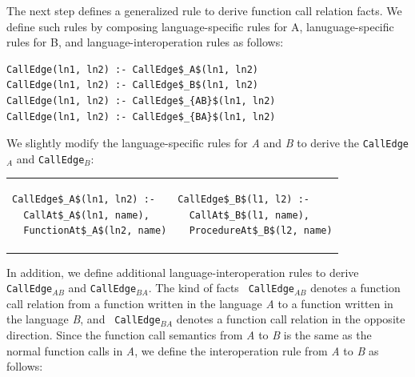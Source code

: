 The next step defines a generalized rule to derive function call relation
facts. We define such rules by composing language-specific rules for A,
lanuguage-specific rules for B, and language-interoperation rules as follows:

\begin{lstlisting}
CallEdge(ln1, ln2) :- CallEdge$_A$(ln1, ln2)
CallEdge(ln1, ln2) :- CallEdge$_B$(ln1, ln2)
CallEdge(ln1, ln2) :- CallEdge$_{AB}$(ln1, ln2)
CallEdge(ln1, ln2) :- CallEdge$_{BA}$(ln1, ln2)
\end{lstlisting}


\noindent 
We slightly modify the language-specific rules for {\it A} and {\it B} to
derive the {\tt CallEdge$_A$} and {\tt CallEdge$_B$}:

\begin{tabular}{ll}
  {\begin{lstlisting}
CallEdge$_A$(ln1, ln2) :-
  CallAt$_A$(ln1, name),
  FunctionAt$_A$(ln2, name)
  \end{lstlisting}} & 
  {\begin{lstlisting}
CallEdge$_B$(l1, l2) :-
  CallAt$_B$(l1, name),
  ProcedureAt$_B$(l2, name)
  \end{lstlisting}}
\end{tabular}

\noindent
In addition, we define additional language-interoperation rules to derive {\tt
CallEdge$_{AB}$} and {\tt CallEdge$_{BA}$}. The kind of facts {\tt
CallEdge$_{AB}$} denotes a function call relation from a function written in
the language {\it A} to a function written in the language {\it B}, and {\tt
CallEdge$_{BA}$} denotes a function call relation in the opposite direction.
Since the function call semantics from {\it A} to {\it B} is the same as the
normal function calls in {\it A}, we define the interoperation rule from {\it
A} to {\it B} as follows: 


